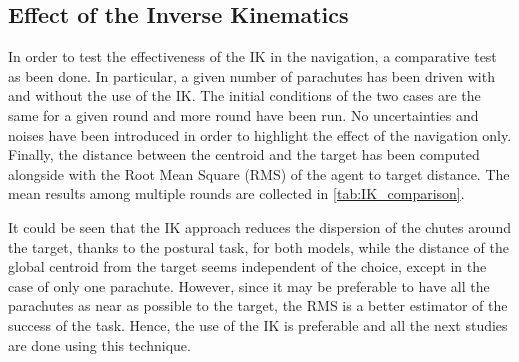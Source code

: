 \subsection{Effect of the Inverse Kinematics}
In order to test the effectiveness of the IK in the navigation, a comparative test as been done. In particular, a given number of parachutes has been driven with and without the use of the IK. The initial conditions of the two cases are the same for a given round and more round have been run. No uncertainties and noises have been introduced in order to highlight the effect of the navigation only. Finally, the distance between the centroid and the target has been computed alongside with the Root Mean Square (RMS) of the agent to target distance. The mean results among multiple rounds are collected in \autoref{tab:IK_comparison}.

It could be seen that the IK approach reduces the dispersion of the chutes around the target, thanks to the postural task, for both models, while the distance of the global centroid from the target seems independent of the choice, except in the case of only one parachute. However, since it may be preferable to have all the parachutes as near as possible to the target, the RMS is a better estimator of the success of the task. Hence, the use of the IK is preferable and all the next studies are done using this technique.
